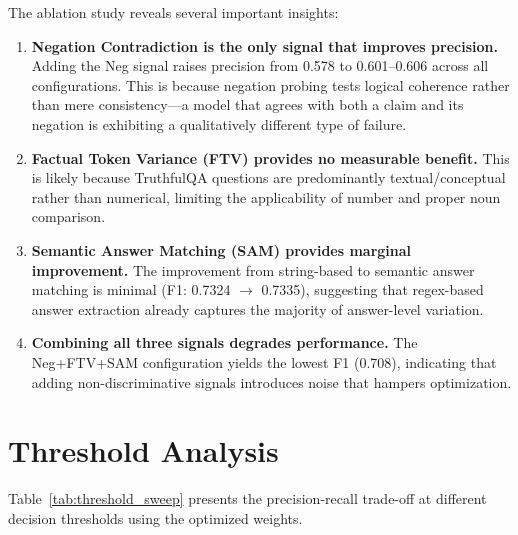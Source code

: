 The ablation study reveals several important insights:

\begin{enumerate}
    \item \textbf{Negation Contradiction is the only signal that improves precision.} Adding the Neg signal raises precision from 0.578 to 0.601--0.606 across all configurations. This is because negation probing tests logical coherence rather than mere consistency---a model that agrees with both a claim and its negation is exhibiting a qualitatively different type of failure.

    \item \textbf{Factual Token Variance (FTV) provides no measurable benefit.} This is likely because TruthfulQA questions are predominantly textual/conceptual rather than numerical, limiting the applicability of number and proper noun comparison.

    \item \textbf{Semantic Answer Matching (SAM) provides marginal improvement.} The improvement from string-based to semantic answer matching is minimal (F1: 0.7324 $\rightarrow$ 0.7335), suggesting that regex-based answer extraction already captures the majority of answer-level variation.

    \item \textbf{Combining all three signals degrades performance.} The Neg+FTV+SAM configuration yields the lowest F1 (0.708), indicating that adding non-discriminative signals introduces noise that hampers optimization.
\end{enumerate}

\section{Threshold Analysis}

Table~\ref{tab:threshold_sweep} presents the precision-recall trade-off at different decision thresholds using the optimized weights.

